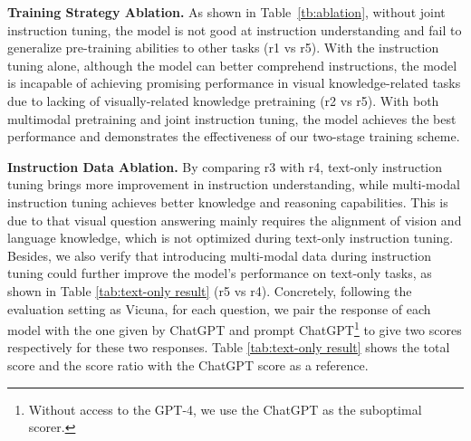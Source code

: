 \documentclass{article}
\begin{document}
\noindent\textbf{Training Strategy Ablation.}
As shown in Table~\ref{tb:ablation}, without joint instruction tuning, the model is 
 not good at instruction understanding and fail to generalize pre-training abilities to other tasks (r1 vs r5). With the instruction tuning alone, although the model can better comprehend instructions, the model is incapable of achieving promising performance in visual knowledge-related tasks due to lacking of visually-related knowledge pretraining (r2 vs r5). With both multimodal pretraining and joint instruction tuning, the model achieves the best performance and demonstrates the effectiveness of our two-stage training scheme.

\noindent\textbf{Instruction Data Ablation.}
By comparing r3 with r4, text-only instruction tuning brings more improvement in instruction understanding, while multi-modal instruction tuning achieves better knowledge and reasoning capabilities. This is due to that visual question answering mainly requires the alignment of vision and language knowledge, which is not optimized during text-only instruction tuning. Besides, we also verify that introducing multi-modal data during instruction tuning could further improve the model's performance on text-only tasks, as shown in Table \ref{tab:text-only result} (r5 vs r4). Concretely, following the evaluation setting as Vicuna\citep{vicuna}, for each question, we pair the response of each model with the one given by ChatGPT and prompt ChatGPT\footnote{Without access to the GPT-4, we use the ChatGPT as the suboptimal scorer.} to give two scores respectively for these two responses. Table \ref{tab:text-only result} shows the total score and the score ratio with the ChatGPT score as a reference. 







\begin{table*}[t]
\centering
{}
\caption{The performance of 80 text-only questions from Vicuna\citep{vicuna} assessed by ChatGPT. }
\label{tab:text-only result}
\end{table*}
\end{document}
